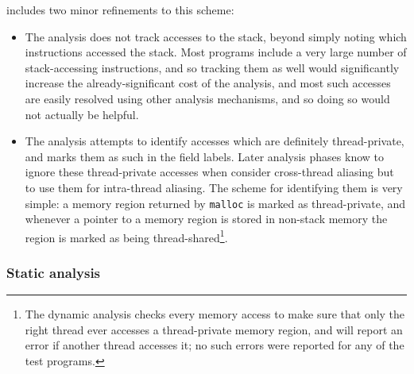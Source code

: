 {\Implementation} includes two minor refinements to this scheme:

\begin{itemize}
\item
  The analysis does not track accesses to the stack, beyond simply
  noting which instructions accessed the stack.  Most programs include
  a very large number of stack-accessing instructions, and so tracking
  them as well would significantly increase the already-significant
  cost of the analysis, and most such accesses are easily
  resolved using other analysis mechanisms, and so doing so would not
  actually be helpful. 
\item
  The analysis attempts to identify accesses which are definitely
  thread-private, and marks them as such in the field labels.  Later
  analysis phases know to ignore these thread-private accesses when
  consider cross-thread aliasing but to use them for intra-thread
  aliasing.  The scheme for identifying them is very simple: a memory
  region returned by \verb|malloc| is marked as thread-private, and
  whenever a pointer to a memory region is stored in non-stack memory
  the region is marked as being thread-shared\footnote{The dynamic analysis checks every
    memory access to make sure that only the right thread ever
    accesses a thread-private memory region, and will report an error
    if another thread accesses it; no such errors were reported for
    any of the test programs.}.
\end{itemize}


\subsubsection{Static analysis}

\label{sect:static_analysis}

